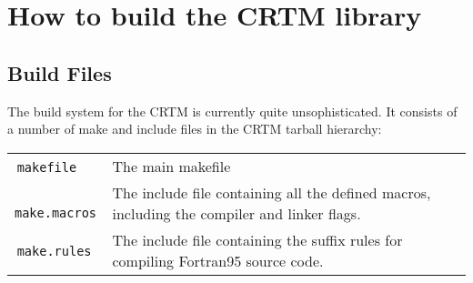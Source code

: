 \chapter{How to build the CRTM library}

\section{Build Files}
The build system for the CRTM is currently quite unsophisticated. It consists of a number of make and include files in the CRTM tarball hierarchy:

\begin{tabular}{l@{ : }p{4.75in}}
  \,\texttt{makefile} & The main makefile\\
  \,\texttt{make.macros} & The include file containing all the defined macros, including the compiler and linker flags.\\
  \,\texttt{make.rules} & The include file containing the suffix rules for compiling Fortran95 source code.\\
\end{tabular}

